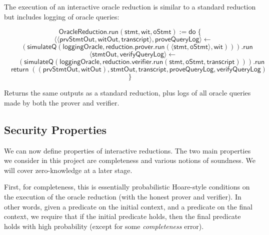 \begin{definition}
    \label{def:oracle_reduction_run}
    The execution of an interactive oracle reduction is similar to a standard reduction but includes logging of oracle queries:

    \[ \mathsf{OracleReduction}.\mathsf{run}(\mathsf{stmt}, \mathsf{wit}, \mathsf{oStmt}) := \mathsf{do} \; \{ \]
    \[ \quad \langle \langle \mathsf{prvStmtOut}, \mathsf{witOut}, \mathsf{transcript} \rangle, \mathsf{proveQueryLog} \rangle \leftarrow \]
    \[ \qquad (\mathsf{simulateQ}(\mathsf{loggingOracle}, \mathsf{reduction}.\mathsf{prover}.\mathsf{run}(\langle \mathsf{stmt}, \mathsf{oStmt} \rangle, \mathsf{wit}))).\mathsf{run} \]
    \[ \quad \langle \mathsf{stmtOut}, \mathsf{verifyQueryLog} \rangle \leftarrow \]
    \[ \qquad (\mathsf{simulateQ}(\mathsf{loggingOracle}, \mathsf{reduction}.\mathsf{verifier}.\mathsf{run}(\mathsf{stmt}, \mathsf{oStmt}, \mathsf{transcript}))).\mathsf{run} \]
    \[ \quad \mathsf{return} \; ((\mathsf{prvStmtOut}, \mathsf{witOut}), \mathsf{stmtOut}, \mathsf{transcript}, \mathsf{proveQueryLog}, \mathsf{verifyQueryLog}) \]
    \[ \} \]

    Returns the same outputs as a standard reduction, plus logs of all oracle queries made by both the prover and verifier.
\end{definition}


\subsection{Security Properties}\label{sec:security}

We can now define properties of interactive reductions. The two main properties we consider in this
project are completeness and various notions of soundness. We will cover zero-knowledge at a later
stage.

First, for completeness, this is essentially probabilistic Hoare-style conditions on the execution
of the oracle reduction (with the honest prover and verifier). In other words, given a predicate on
the initial context, and a predicate on the final context, we require that if the initial predicate
holds, then the final predicate holds with high probability (except for some \emph{completeness}
error).

